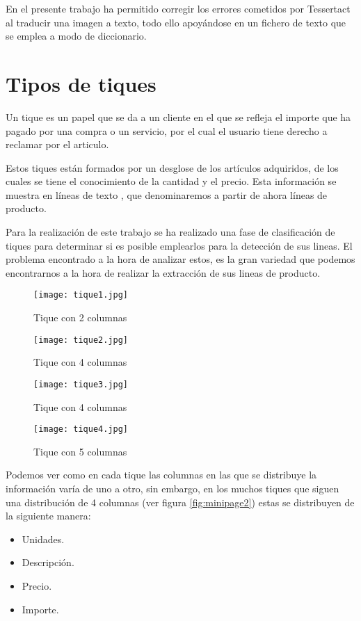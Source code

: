 En el presente trabajo ha permitido corregir los errores cometidos por Tessertact al traducir una imagen a texto, todo ello apoyándose en un fichero de texto que se emplea a modo de diccionario.

\section{Tipos de tiques}

Un tique es un papel que se da a un cliente en el que se refleja el importe que ha pagado por una compra o un servicio, por el cual el usuario tiene derecho a reclamar por el articulo\cite{tique}.

Estos tiques están formados por un desglose de los artículos adquiridos, de los cuales se tiene el conocimiento de la cantidad y el  precio. Esta información se muestra en líneas de texto , que denominaremos a partir de ahora líneas de producto.

Para la realización de este trabajo se ha realizado una fase de clasificación de tiques para determinar si es posible emplearlos para la detección de sus lineas.
El problema encontrado a la hora de analizar estos, es la gran variedad que podemos encontrarnos a la hora de realizar la extracción de sus lineas de producto.
\begin{figure}[ht]
		\centering
		\begin{minipage}[b]{0.45\linewidth}
			\texttt{[image: tique1.jpg]}
			\caption{Tique con 2 columnas}
			\label{fig:minipage1}
	\end{minipage}
	\quad
	\begin{minipage}[b]{0.45\linewidth}
		\texttt{[image: tique2.jpg]}
		\caption{Tique con 4 columnas}
		\label{fig:minipage2}
		\end{minipage}
		\quad
		\begin{minipage}[b]{0.45\linewidth}
			\texttt{[image: tique3.jpg]}
			\caption{Tique con 4 columnas}
			\label{fig:minipage3}
	\end{minipage}
	\quad
	\begin{minipage}[b]{0.45\linewidth}
		\texttt{[image: tique4.jpg]}
		\caption{Tique con 5 columnas}
		\label{fig:minipage4}
		\end{minipage}
\end{figure}

\cleardoublepage

Podemos ver como en cada tique las columnas en las que se distribuye la información varía de uno a otro, sin embargo, en los muchos tiques que siguen una distribución de 4 columnas (ver figura \ref{fig:minipage2}) estas se distribuyen de la siguiente manera:
\begin{itemize}
	\item Unidades.
	\item Descripción.
	\item Precio.
	\item Importe.
\end{itemize}


